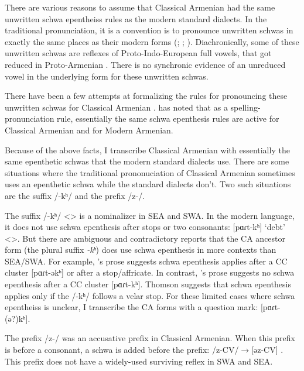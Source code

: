 There are various reasons to assume that Classical Armenian had the same unwritten schwa epentheiss rules as the modern standard dialects. In the traditional pronunciation, it is a convention is to pronounce unwritten schwas in exactly the same places as their modern forms (\citealt[16]{Godel-1975-IntroClassicalArmenian}; \citealt[116]{Thomson-1989-IntroClassicalArmenian}; \citealt[1043]{Macak-2017-PhonoClassicalArmenian}). Diachronically, some of these unwritten schwas are reflexes of Proto-Indo-European full vowels, that got reduced in Proto-Armenian \citep[26]{Vaux-1998-ArmenianPhono}. There is no synchronic evidence of an unreduced vowel in the underlying form for these unwritten schwas.

There have been a few attempts at formalizing the rules for pronouncing these unwritten schwas for Classical Armenian \citep{Hammalian-1984-PhonoOldArmenian,Schwink-1994-ArmenianSchwaLexicalized,Pierce-2007-SchwaClassicalArmenian}. \citet{Pierce-2007-SchwaClassicalArmenian} has noted that as a spelling-pronunciation rule, essentially the same schwa epenthesis rules are active for Classical Armenian and for Modern Armenian.

Because of the above facts, I transcribe Classical Armenian with essentially the same epenthetic schwas that the modern standard dialects use. There are some situations where the traditional prononuciation of Classical Armenian sometimes uses an epenthetic schwa while the standard dialects don't. Two such situations are the suffix /-kʰ/ and the prefix /z-/. 

The suffix /-kʰ/ <> is a nominalizer in SEA and SWA. In the modern language, it does not use schwa epenthesis after stops or two consonants: [pɑɾt-kʰ] `debt' <>. But there are ambiguous and contradictory reports that the CA ancestor form (the plural suffix \textit{-kʰ}) does use schwa epenthesis in more contexts than SEA/SWA. For example, \citealt[18-19]{Godel-1975-IntroClassicalArmenian}'s prose suggests schwa epenthesis applies after a CC cluster [pɑɾt-əkʰ] or after a stop/affricate. In contrast, \citealt[120]{Thomson-1989-IntroClassicalArmenian}'s prose suggests no schwa epenthesis after a CC cluster [pɑɾt-kʰ]. Thomson suggests that schwa epenthesis applies only if the /-kʰ/ follows a velar stop. For these limited cases where schwa epentheiss is unclear, I transcribe the CA forms with a question mark: [pɑɾt-(ə?)kʰ]. 

The prefix /z-/ was an accusative prefix in Classical Armenian. When this prefix is before a consonant, a schwa is added before the prefix: /z-CV/$\rightarrow$[əz-CV] \citep[116]{Thomson-1989-IntroClassicalArmenian}. This prefix does not have a widely-used surviving reflex in SWA and SEA.


